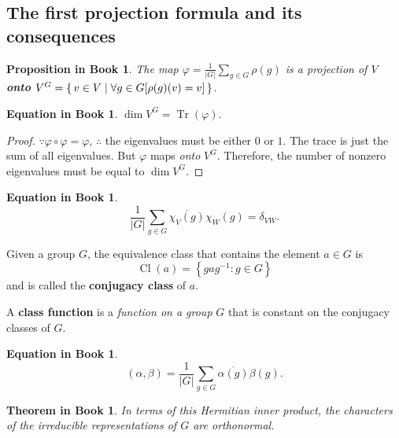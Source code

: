 \documentclass[12pt, letterpaper]{article}
\newcommand{\Tr}{\operatorname{Tr}}
\newcommand{\Cl}{\operatorname{Cl}}
\newcommand{\card}[1]{\left\lvert #1 \right\rvert}
\newcommand{\conj}{\overline}
\theoremstyle{definition}
\theoremstyle{remark}
\theoremstyle{definition}
\newtheorem{eq}[exe]{Equation in Book}
\theoremstyle{plain}
\newtheorem{pprop}[exe]{Proposition in Book}
\newtheorem{tthm}[exe]{Theorem in Book}
\numberwithin{equation}{section}
\begin{document}
	\subsection{The first projection formula and its consequences}
	
	
	\begin{pprop}
		The map $\varphi=\frac{1}{\card{G}}\sum_{g\in G}\rho(g)$ is a projection of $V$
		\textbf{onto} $V^G=\set{v\in V|\forall g\in G[\rho(g)(v)=v]}$.
	\end{pprop}
	
	\begin{eq}
		$\dim V^G=\Tr(\varphi).$
	\end{eq}
	\begin{proof}
		$\because\varphi\circ\varphi=\varphi$,
		$\therefore$ the eigenvalues must be either $0$ or $1$.
		The trace is just the sum of all eigenvalues.
		But $\varphi$ maps \textit{onto} $V^G$. Therefore, the number of nonzero eigenvalues must
		be equal to $\dim V^G$.
	\end{proof}

	\begin{eq}\label{eq2.10orthonormal}
		\[\frac{1}{\card{G}}\sum_{g\in G}\conj{\chi_V(g)}\chi_W(g)=\delta_{VW}.\]
	\end{eq}

	\begin{def*}
		Given a group $G$, the equivalence class that contains the element $a\in G$ is
		\[\Cl(a)=\left\{gag^{-1}:g\in G\right\}\]
		and is called the \textbf{conjugacy class} of $a$.
	\end{def*}
	\begin{def*}
		A \textbf{class function} is a \textit{function on a group} $G$ that is constant on the conjugacy classes of $G$.
	\end{def*}
	
	\begin{eq}\label{eqInnerProdClFunc}
		\[(\alpha,\beta)=\frac{1}{\card{G}}\sum_{g\in G}\conj{\alpha(g)}\beta(g).\]
	\end{eq}
	
	\begin{tthm}
		In terms of this Hermitian inner product, the characters of the irreducible 
		representations of $G$ are orthonormal.
	\end{tthm}
\end{document}
